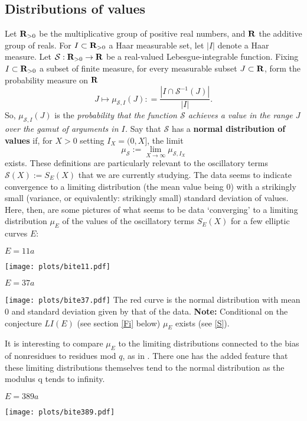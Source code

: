 \documentclass[11pt]{article}
\theoremstyle{plain}
\theoremstyle{definition}
\numberwithin{equation}{section}
\numberwithin{figure}{section}
\numberwithin{table}{section}
\def\S{\mathcal{S}}
\def\R{{\bf R}}
\begin{document}
\subsection{Distributions of values }

Let ${\R}_{>0}$ be the multiplicative group of positive real numbers, and ${\R}$ the additive group of reals. For $I \subset {\R}_{>0}$ a Haar measurable set, let $|I|$ denote a Haar measure.  Let ${\S}:{\R}_{>0} \to {\R}$ be a real-valued Lebesgue-integrable function.  Fixing $I \subset {\R}_{>0}$ a subset  of finite measure,  for every measurable subset $J\subset {\R}$, form the probability measure on ${\R}$
$$J\mapsto \mu_{{\S},I}(J): = {\frac{|I\cap {\S}^{-1}(J)|}{|I|}}.$$  So, $\mu_{{\S},I}(J)$ is the {\it probability that the function ${\S}$ achieves a value in the range $J$ over the gamut of arguments in $I$.}   Say that ${\S}$ has a {\bf normal distribution of values} if, for $X > 0$ setting $I_X= (0,X]$, the limit  $$\mu_{{\S}}:= \lim_{X \to \infty}\mu_{{\S},I_X}$$ exists. These  definitions are particularly relevant to the oscillatory terms ${\S}(X):= S_E(X)$ that we are currently studying. The data seems to indicate convergence to a limiting distribution (the  mean  value being $0$) with a strikingly small (variance, or equivalently: strikingly small) standard deviation of values.
\vskip20pt
Here, then, are some pictures  of what seems to be data `converging' to a limiting  distribution $\mu_E$ of the values of the oscillatory terms $S_E(X)$ for a few elliptic curves $E$:
  \vskip10pt
  \centerline{ $E = 11a$}
 \vskip10pt
 \hskip100pt \texttt{[image: plots/bite11.pdf]}
    \vskip10pt
  \centerline{ $E = 37a$}
  \vskip10pt
 \hskip100pt \texttt{[image: plots/bite37.pdf]}
    \vskip10pt
       The red curve is the normal distribution with mean $0$ and standard deviation given by that of the data.
   \vskip10pt
    {\bf  Note: } Conditional on the conjecture $LI(E)$ (see section \ref{Fi} below) $\mu_E$ exists (see \ref{S}).

     It is interesting  to compare $\mu_E$ to the limiting distributions connected to the bias of nonresidues to residues mod $q$, as in \cite{R-S}. There one has the added feature that these limiting distributions themselves tend to the normal distribution as the modulus q tends to infinity.
  \centerline{ $E = 389a$}
  \vskip10pt
\hskip100pt  \texttt{[image: plots/bite389.pdf]}
\end{document}
